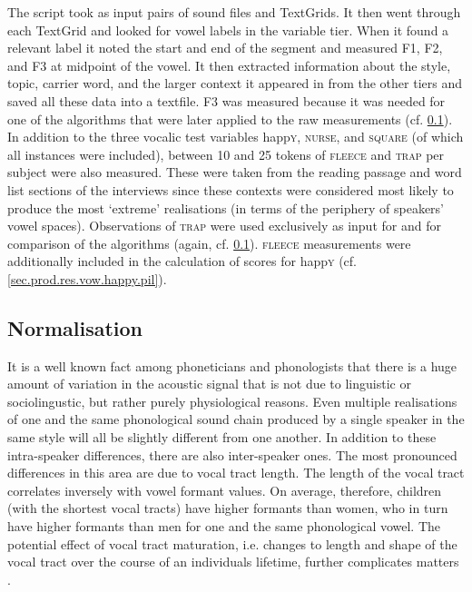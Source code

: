 The script took as input pairs of sound files and TextGrids.
It then went through each TextGrid and looked for vowel labels in the variable tier.
When it found a relevant label it noted the start and end of the segment and measured F1, F2, and F3 at midpoint of the vowel.
It then extracted information about the style, topic, carrier word, and the larger context it appeared in from the other tiers and saved all these data into a textfile.
F3 was measured because it was needed for one of the  algorithms that were later applied to the raw measurements (cf. \ref{sec.prod_method.norm}).
In addition to the three vocalic test variables happ\textsc{y}, \textsc{nurse}, and \textsc{square} (of which all instances were included), between 10 and 25 tokens of \textsc{fleece} and \textsc{trap} per subject were also measured.
These were taken from the reading passage and word list sections of the interviews since these contexts were considered most likely to produce the most `extreme' realisations (in terms of the periphery of speakers' vowel spaces).
Observations of \textsc{trap} were used exclusively as input for  and for comparison of the algorithms (again, cf. \ref{sec.prod_method.norm}).
\textsc{fleece} measurements were additionally included in the calculation of  scores for happ\textsc{y} (cf. \ref{sec.prod.res.vow.happy.pil}).

\subsection{Normalisation}\label{sec.prod_method.norm}

It is a well known fact among phoneticians and phonologists that there is a huge amount of variation in the acoustic signal that is not due to linguistic or sociolingustic, but rather purely physiological reasons.
Even multiple realisations of one and the same phonological sound chain produced by a single speaker in the same style will all be slightly different from one another.
In addition to these intra-speaker differences, there are also inter-speaker ones.
The most pronounced differences in this area are due to vocal tract length.
The length of the vocal tract correlates inversely with vowel formant values.
On average, therefore, children (with the shortest vocal tracts) have higher formants than women, who in turn have higher formants than men for one and the same phonological vowel.
The potential effect of vocal tract maturation, i.e. changes to length and shape of the vocal tract over the course of an individuals lifetime, further complicates matters \parencite[cf.][440--441]{harrington2006}.

